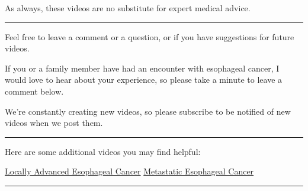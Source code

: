 \documentclass[
]{article}
\begin{document}
As always, these videos are no substitute for expert medical advice.

\begin{center}\rule{0.5\linewidth}{0.5pt}\end{center}

Feel free to leave a comment or a question, or if you have suggestions
for future videos.

If you or a family member have had an encounter with esophageal cancer,
I would love to hear about your experience, so please take a minute to
leave a comment below.

We're constantly creating new videos, so please subscribe to be notified
of new videos when we post them.

\begin{center}\rule{0.5\linewidth}{0.5pt}\end{center}

Here are some additional videos you may find helpful:

\href{14-Eso_Locally_Advanced.html}{Locally Advanced Esophageal Cancer}
\href{16-Eso_Metastatic.html}{Metastatic Esophageal Cancer}

\begin{center}\rule{0.5\linewidth}{0.5pt}\end{center}
\end{document}
